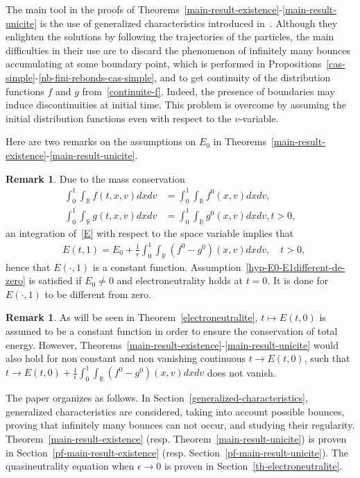 \documentclass[10pt]{amsart}
\theoremstyle{definition}\newtheorem{defi}[theo]{Definition}\newtheorem{rema}[theo]{Remark}\newtheorem{exam}[theo]{Example}\newtheorem{exem}[theo]{Example}\newtheorem{nota}[theo]{Notation}
\newcommand{\R}{\mathbb{R}}
\begin{document}
The main tool in the proofs of Theorems~\ref{main-result-existence}-\ref{main-result-unicite} is the use of generalized characteristics introduced in~\cite{Guo95}. Although they enlighten the solutions by following the trajectories of the particles, the main difficulties in their use are to discard the phenomenon of infinitely many bounces accumulating at some boundary point, which is performed in Propositions~\ref{cas-simple}-\ref{nb-fini-rebonds-cas-simple}, and to get continuity of the distribution functions $f$ and $g$ from~\eqref{continuite-f}. Indeed, the presence of boundaries may induce discontinuities at initial time. This problem is overcome by assuming the initial distribution functions even with respect to the $v$-variable.


Here are two remarks on the assumptions on $E_0$ in Theorems~\ref{main-result-existence}-\ref{main-result-unicite}.
\begin{rema}
Due to the mass conservation
\begin{align*}
\int _0^1\int _\R f(t,x,v)dxdv &= \int _0^1\int _\R f^0(x,v)dxdv,\\
\int _0^1\int _\R g(t,x,v)dxdv &= \int _0^1\int _\R g^0(x,v)dxdv, t>0,
\end{align*}
an integration of~\eqref{E} with respect to the space variable implies that
\begin{align*}
&E(t,1)= E_0+\frac{1}{\epsilon }\int _0^1\int _\R \left(f^0-g^0\right)(x,v)dxdv,\quad t>0,
\end{align*}
hence that $E(\cdot,1)$ is a constant function. Assumption~\eqref{hyp-E0-E1different-de-zero} is satisfied if $E_0\neq 0$ and electroneutrality holds at $t=0$. It is done for $E(\cdot,1)$ to be different from zero.
\end{rema}
\begin{rema}
As will be seen in Theorem~\ref{electroneutralite}, $t \mapsto E(t,0)$ is assumed to be a constant function in order to ensure the conservation of total energy. However, Theorems~\ref{main-result-existence}-\ref{main-result-unicite} would also hold for non constant and non vanishing continuous $t\rightarrow E(t,0)$, such that $t\rightarrow E(t,0)+\frac{1}{\epsilon }\int _0^1\int _\R (f^0-g^0)(x,v)dxdv$ does not vanish.
\end{rema}

The paper organizes as follows. In Section~\ref{generalized-characteristics}, generalized characteristics are considered, taking into account possible bounces, proving that infinitely many bounces can not occur, and studying their regularity. Theorem~\ref{main-result-existence} (resp. Theorem~\ref{main-result-unicite}) is proven in Section~\ref{pf-main-result-existence} (resp. Section~\ref{pf-main-result-unicite}). The quasineutrality equation when $\epsilon
\to 0$ is proven in Section~\ref{th-electroneutralite}.
\end{document}
